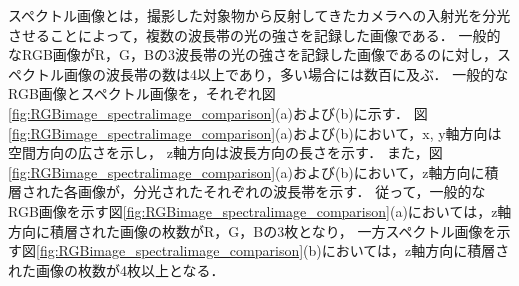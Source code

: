 スペクトル画像とは，撮影した対象物から反射してきたカメラへの入射光を分光させることによって，複数の波長帯の光の強さを記録した画像である\cite{中野1996}\cite{眞鍋1996}\cite{Tominaga1999}．
一般的なRGB画像がR，G，Bの3波長帯の光の強さを記録した画像であるのに対し，スペクトル画像の波長帯の数は4以上であり，多い場合には数百に及ぶ\cite{Goetz1985}．%
一般的なRGB画像とスペクトル画像を，それぞれ図\ref{fig:RGBimage_spectralimage_comparison}(a)および(b)に示す．
図\ref{fig:RGBimage_spectralimage_comparison}(a)および(b)において，x, y軸方向は空間方向の広さを示し，
z軸方向は波長方向の長さを示す．
また，図\ref{fig:RGBimage_spectralimage_comparison}(a)および(b)において，z軸方向に積層された各画像が，分光されたそれぞれの波長帯を示す．
従って，一般的なRGB画像を示す図\ref{fig:RGBimage_spectralimage_comparison}(a)においては，z軸方向に積層された画像の枚数がR，G，Bの3枚となり，
一方スペクトル画像を示す図\ref{fig:RGBimage_spectralimage_comparison}(b)においては，z軸方向に積層された画像の枚数が4枚以上となる．



